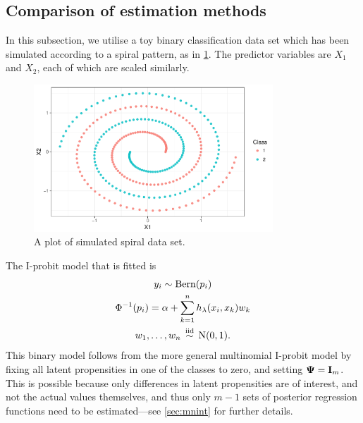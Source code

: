 
\subsection{Comparison of estimation methods}

In this subsection, we utilise a toy binary classification data set which has been simulated according to a spiral pattern, as in \cref{fig:exampleiprobit}.
The predictor variables are $X_1$ and $X_2$, each of which are scaled similarly.

\begin{figure}[hbt]
  \centering
  \includegraphics[width=0.8\textwidth]{figure/05-example_data}
  \caption{A plot of simulated spiral data set.}
  \label{fig:exampleiprobit}
\end{figure}

The I-probit model that is fitted is
\begin{gather*}
  y_i \sim \operatorname{Bern}(p_i) \\
  \Phi^{-1}(p_i) = \alpha + \sum_{k=1}^n h_\lambda(x_i,x_k)w_k  \\
  w_1,\dots,w_n \,\overset{\text{iid}}{\sim}\, \operatorname{N}(0,1).
\end{gather*}
This binary model follows from the more general multinomial I-probit model by fixing all latent propensities in one of the classes to zero, and setting ${\bm\Psi} = {\mathbf I}_m$.
This is possible because only differences in latent propensities are of interest, and not the actual values themselves, and thus only $m-1$ sets of posterior regression functions need to be estimated---see \cref{sec:mnint} for further details.

